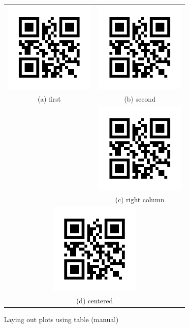 \documentclass{article}
\begin{document}
\begin{figure}
\centering
\begin{tabular}{cc}
  \includegraphics[width=45mm]{it} &   \includegraphics[width=45mm]{it} \\
 (a) first & (b) second \\[6pt]
  \null &   \includegraphics[width=45mm]{it} \\
  \null & (c) right column \\[6pt]
\multicolumn{2}{c}{\includegraphics[width=45mm]{it} }\\
\multicolumn{2}{c}{(d) centered}
\end{tabular}
\caption{Laying out plots using table (manual)}
\end{figure}
\end{document}
